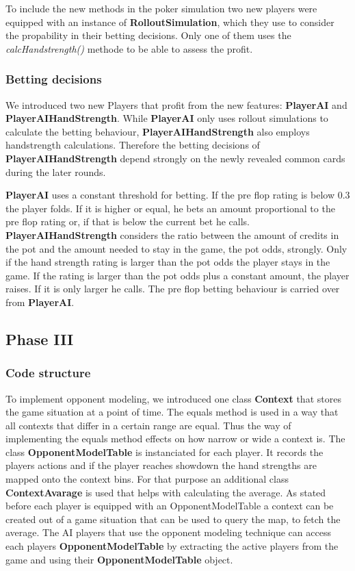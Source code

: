To include the new methods in the poker simulation two new players were equipped with an instance of
\textbf{RolloutSimulation}, which they use to consider the propability in their betting decisions. Only one of them uses
the \textit{calcHandstrength()} methode to be able to assess the profit.


\subsubsection{Betting decisions}

We introduced two new Players that profit from the new features: \textbf{PlayerAI} and \textbf{PlayerAIHandStrength}.
While \textbf{PlayerAI} only uses rollout simulations to calculate the betting behaviour, \textbf{PlayerAIHandStrength}
also employs handstrength calculations. Therefore the betting decisions of \textbf{PlayerAIHandStrength} depend strongly
on the newly revealed common cards during the later rounds.

\textbf{PlayerAI} uses a constant threshold for betting. If the pre flop rating is below 0.3 the player folds. If it is
higher or equal, he bets an amount proportional to the pre flop rating or, if that is below the current bet he calls.
\textbf{PlayerAIHandStrength} considers the ratio between the amount of credits in the pot and the amount needed to stay
in the game, the pot odds, strongly. Only if the hand strength rating is larger than the pot odds the player stays in
the game. If the rating is larger than the pot odds plus a constant amount, the player raises. If it is only larger he
calls. The pre flop betting behaviour is carried over from \textbf{PlayerAI}.

\subsection{Phase III}

\subsubsection{Code structure}

To implement opponent modeling, we introduced one class \textbf{Context} that stores the game situation at a point of time. The equals method is used in a way that all contexts that differ in a certain range are equal. Thus the way of implementing the equals method effects on how narrow or wide a context is.
The class \textbf{OpponentModelTable} is instanciated for each player. It records the players actions and if the player reaches showdown the hand strengths are mapped onto the context bins. For that purpose an additional class \textbf{ContextAvarage} is used that helps with calculating the average.
As stated before each player is equipped with an OpponentModelTable a context can be created out of a game situation that can be used to query the map, to fetch the average.
The AI players that use the opponent modeling technique can access each players \textbf{OpponentModelTable} by extracting the active players from the game and using their \textbf{OpponentModelTable} object.

